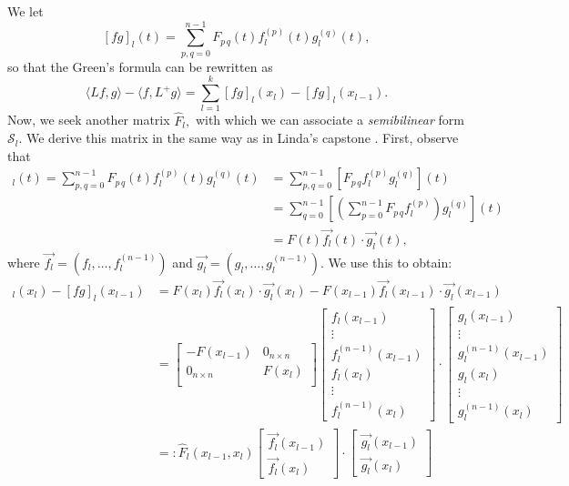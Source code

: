 \documentclass[11pt,reqno,oneside,a4paper]{article}
\theoremstyle{plain} %
\theoremstyle{definition}
\theoremstyle{remark}
\begin{document}
We let 
\[ 
[fg]_l(t) = \sum_{p,q=0}^{n-1}F_{p\,q}(t)f_l^{(p)}(t)g_l^{(q)}(t),
\]
so that the Green's formula can be rewritten as 
\[ \langle Lf,g\rangle - \langle f,L^+ g\rangle = \sum_{l=1}^{k} [fg]_l(x_l) - [fg]_l(x_{l-1}).\]
Now, we seek another matrix $\widehat{F}_l,$ with which we can associate a \emph{semibilinear} form $\mathcal{S}_l$. We derive this matrix in the same way as in Linda's capstone \cite{linfan}. First, observe that 
\begin{align*}
[fg]_l(t) = \sum_{p,q=0}^{n-1}F_{p\,q}(t) f_l^{(p)}(t)g_l^{(q)}(t) &= \sum_{p,q=0}^{n-1}\left[F_{p\,q} f_l^{(p)} g_l^{(q)}\right](t)  \\
&= \sum_{q=0}^{n-1}\left[ \left(\sum_{p=0}^{n-1} F_{p\,q} f_l^{(p)}\right) g_l^{(q)}\right](t) \\
&= F(t) \vec{f_l}(t) \cdot \vec{g_l}(t), 
\end{align*}
where $\vec{f_l} = (f_l, \ldots, f_l^{(n-1)})$ and $\vec{g_l} = (g_l, \ldots, g_l^{(n-1)}).$ We use this to obtain:
\begin{align*}
[fg]_l(x_l) - [fg]_l(x_{l-1}) &= F(x_l) \vec{f_l}(x_l) \cdot \vec{g_l}(x_l) - F(x_{l-1}) \vec{f_l}(x_{l-1}) \cdot \vec{g_l}(x_{l-1}) \\
&= \begin{bmatrix}
- F(x_{l-1}) & 0_{n\times n} \\
0_{n\times n} &  F(x_{l}) \\
\end{bmatrix}
\begin{bmatrix}
f_l(x_{l-1})  \\
\vdots \\
f_l^{(n-1)}(x_{l-1}) \\
f_l(x_{l})  \\
\vdots \\
f_l^{(n-1)}(x_{l}) 
\end{bmatrix}
\cdot
\begin{bmatrix}
g_l(x_{l-1})  \\
\vdots \\
g_l^{(n-1)}(x_{l-1}) \\
g_l(x_{l})  \\
\vdots \\
g_l^{(n-1)}(x_{l}) 
\end{bmatrix} \\
&=: \widehat{F}_l(x_{l-1}, x_l)  
\begin{bmatrix}
\vec{f_l}(x_{l-1})  \\
\vec{f_l}(x_{l}) 
\end{bmatrix}
\cdot
\begin{bmatrix}
\vec{g_l}(x_{l-1})  \\
\vec{g_l}(x_{l}) 
\end{bmatrix} \\
\end{align*}
\end{document}
